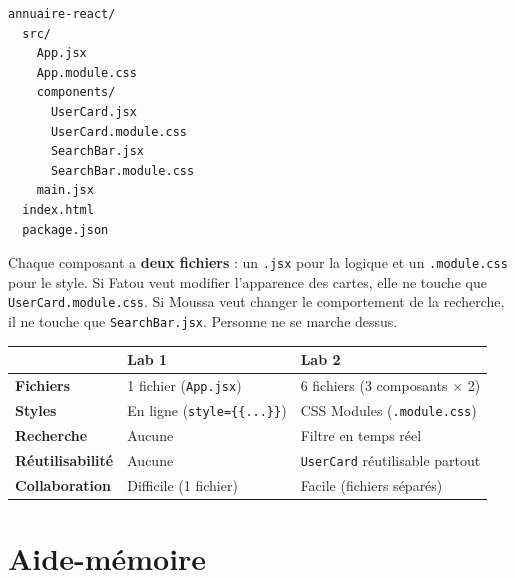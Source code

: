 \documentclass[11pt,a4paper]{article}
\begin{document}
\begin{lstlisting}[style=terminal]
annuaire-react/
  src/
    App.jsx
    App.module.css
    components/
      UserCard.jsx
      UserCard.module.css
      SearchBar.jsx
      SearchBar.module.css
    main.jsx
  index.html
  package.json
\end{lstlisting}

Chaque composant a \textbf{deux fichiers} : un \texttt{.jsx} pour la logique et un \texttt{.module.css} pour le style. Si Fatou veut modifier l'apparence des cartes, elle ne touche que \texttt{UserCard.module.css}. Si Moussa veut changer le comportement de la recherche, il ne touche que \texttt{SearchBar.jsx}. Personne ne se marche dessus.

\begin{retenirbox}
\begin{center}
\begin{tabular}{lp{5cm}p{5cm}}
\toprule
& \textbf{Lab 1} & \textbf{Lab 2} \\
\midrule
\textbf{Fichiers} & 1 fichier (\texttt{App.jsx}) & 6 fichiers (3 composants $\times$ 2) \\
\textbf{Styles} & En ligne (\texttt{style=\{\{...\}\}}) & CSS Modules (\texttt{.module.css}) \\
\textbf{Recherche} & Aucune & Filtre en temps réel \\
\textbf{Réutilisabilité} & Aucune & \texttt{UserCard} réutilisable partout \\
\textbf{Collaboration} & Difficile (1 fichier) & Facile (fichiers séparés) \\
\bottomrule
\end{tabular}
\end{center}
\end{retenirbox}

\section{Aide-mémoire}
\label{sec:aide-memoire}
\end{document}
